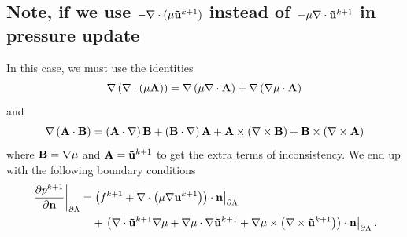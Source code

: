 \documentclass[letterpaper]{erdc}
\begin{document}
\subsection{Note, if we use $-\nabla\cdot(\mu\mathbf{\tilde{u}}^{k+1})$ instead of $-\mu\nabla\cdot\mathbf{\tilde{u}}^{k+1}$ in pressure update}
In this case, we must use the identities
\begin{equation}
    \nabla\left( \nabla\cdot\left( \mu \mathbf{A}\right) \right) = \nabla\left(\mu\nabla\cdot\mathbf{A}\right) + \nabla\left( \nabla\mu\cdot\mathbf{A} \right)
\end{equation}
and 
\begin{equation}
  \nabla\left(\mathbf{A}\cdot \mathbf{B}\right) = \left( \mathbf{A}\cdot\nabla\right)\mathbf{B} + \left( \mathbf{B}\cdot\nabla\right)\mathbf{A} + \mathbf{A}\times\left(\nabla\times\mathbf{B}\right) + \mathbf{B}\times\left(\nabla\times\mathbf{A}\right)
\end{equation}
  where $\mathbf{B} = \nabla\mu$ and $\mathbf{A} = \mathbf{\tilde{u}}^{k+1}$ to get the extra terms of inconsistency.  We end up with the following boundary conditions
\begin{equation}
  \begin{split}\left.\frac{\partial p^{k+1}}{\partial \textbf{n}}\right|_{\partial\Lambda} = &\left.\left(f^{k+1} + \nabla\cdot\left(\mu\nabla\textbf{u}^{k+1}\right) \right)\cdot \textbf{n}\right|_{\partial\Lambda}\\ &+ \left.\left(\nabla\cdot\mathbf{\tilde{u}}^{k+1}\nabla\mu  + \nabla\mu\cdot\nabla\mathbf{\tilde{u}}^{k+1} + \nabla\mu\times\left( \nabla\times\mathbf{\tilde{u}}^{k+1}\right) \right)\cdot\textbf{n}\right|_{\partial\Lambda}. \end{split}
\end{equation}





%
%
\end{document}
